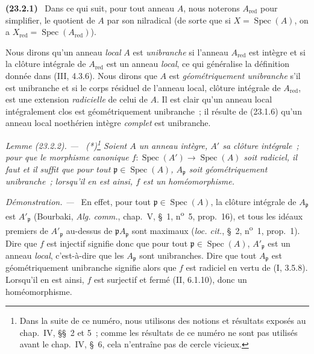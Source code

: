 \documentclass[10pt,oneside]{book}
\makeatletter
\newcommand{\setmanualcurrentlabel}[1]{\def\@currentlabel{#1}}
\newenvironment{env}[1][]{\setmanualcurrentlabel{#1}\par\medskip\noindent\textbf{(#1)}\ }{\par}
\newenvironment{lemma}[1][]{%
  \setmanualcurrentlabel{#1}\par\medskip\noindent\itshape Lemme (#1). ---\ }{\par}
\newenvironment{proof}{%
  \par\medskip\noindent\textit{Démonstration. ---\ }}{\par}
\makeatother
\begin{document}
\begin{env}[23.2.1]
\label{0.23.2.1-fr}
Dans ce qui suit, pour tout anneau $A$, nous noterons $A_{\mathrm{red}}$ pour
simplifier, le quotient de $A$ par son nilradical (de sorte que si
$X=\operatorname{Spec}(A)$, on a
$X_{\mathrm{red}}=\operatorname{Spec}(A_{\mathrm{red}})$).

Nous dirons qu'un anneau \emph{local} $A$ est \emph{unibranche} si l'anneau
$A_{\mathrm{red}}$ est intègre et si la clôture intégrale de
$A_{\mathrm{red}}$ est un anneau \emph{local}, ce qui généralise la définition
donnée dans (III, 4.3.6). Nous dirons que $A$ est \emph{géométriquement
unibranche} s'il est unibranche et si le corps résiduel de l'anneau local,
clôture intégrale de $A_{\mathrm{red}}$, est une extension \emph{radicielle}
de celui de $A$. Il est clair qu'un anneau local intégralement clos est
géométriquement unibranche~; il résulte de (23.1.6) qu'un anneau local
noethérien intègre \emph{complet} est unibranche.
\end{env}

\begin{lemma}[23.2.2]
\label{0.23.2.2-fr}
\textnormal{(*)}\footnote{Dans la suite de ce numéro, nous utilisons des
notions et résultats exposés au chap.~IV, §§~2 et 5~; comme les résultats de
ce numéro ne sont pas utilisés avant le chap.~IV, §~6, cela n'entraîne pas de
cercle vicieux.} Soient $A$ un anneau intègre, $A'$ sa clôture intégrale~; pour
que le morphisme canonique
$f:\operatorname{Spec}(A')\to\operatorname{Spec}(A)$ soit radiciel, il faut et
il suffit que pour tout $\mathfrak p\in\operatorname{Spec}(A)$,
$A_{\mathfrak p}$ soit géométriquement unibranche~; lorsqu'il en est ainsi,
$f$ est un homéomorphisme.
\end{lemma}

\begin{proof}
En effet, pour tout $\mathfrak p\in\operatorname{Spec}(A)$, la clôture
intégrale de $A_{\mathfrak p}$ est $A'_{\mathfrak p}$ (Bourbaki,
\emph{Alg. comm.}, chap.~V, §~1, n\textsuperscript{o}~5, prop.~16), et tous
les idéaux premiers de $A'_{\mathfrak p}$ au-dessus de
$\mathfrak pA_{\mathfrak p}$ sont maximaux (\emph{loc. cit.}, §~2,
n\textsuperscript{o}~1, prop.~1). Dire que $f$ est injectif signifie donc que
pour tout $\mathfrak p\in\operatorname{Spec}(A)$, $A'_{\mathfrak p}$ est un
anneau \emph{local}, c'est-à-dire que les $A_{\mathfrak p}$ sont
unibranches. Dire que tout $A_{\mathfrak p}$ est géométriquement unibranche
signifie alors que $f$ est radiciel en vertu de (I, 3.5.8). Lorsqu'il en est
ainsi, $f$ est surjectif et fermé (II, 6.1.10), donc un homéomorphisme.
\end{proof}
\end{document}
